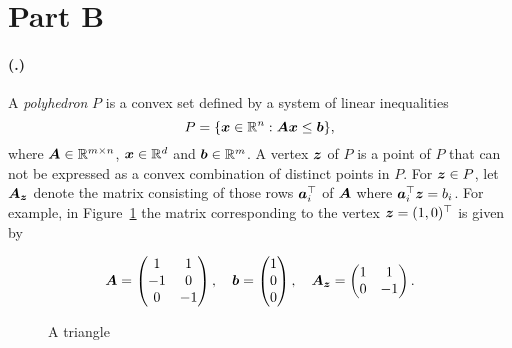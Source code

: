 \documentclass{article}
\newcounter{problemSheetNumber}
\newcounter{problems}
\renewcommand{\problem}{\paragraph{(\theproblemSheetNumber.\theproblems)}\addtocounter{problems}{1}}
\begin{document}
\begin{itemize}
\begin{figure}[h!]
\end{figure}
\end{itemize}

\section*{Part B}
\problem A {\em polyhedron} $P$ is a convex set defined by a system of linear inequalities
\begin{equation*}
 P = \{\bm{x}\in \mathbb{R}^n \mathrel{\mathop{:}} \bm{A}\bm{x}\leq \bm{b}\},
\end{equation*}
where $\bm{A}\in \mathbb{R}^{m\times n}$, $\bm{x}\in \mathbb{R}^d$ and $\bm{b}\in \mathbb{R}^m$. A vertex $\bm{z}$ of $P$ is a point of $P$ that can not
be expressed as a convex combination of distinct points in $P$. 
For $\bm{z}\in P$, let $\bm{A}_{\bm{z}}$ denote the matrix consisting of those rows $\bm{a}_i^{\top}$ of $\bm{A}$ where $\bm{a}_i^{\top}\bm{z}=b_i$. For example, in Figure~\ref{fig:triangle} the matrix corresponding to the vertex $\bm{z}=(1,0)^{\top}$ is given by
\begin{figure}[h!]
\centering
\begin{minipage}{0.3\textwidth}
\centering
{}
\end{minipage}%
\begin{minipage}{0.7\textwidth}
\begin{equation*}
 \bm{A} = \begin{pmatrix}
            1 & 1\\
            -1 & 0\\
            0 & -1\\
           \end{pmatrix}, \quad
 \bm{b} = \begin{pmatrix}
            1 \\ 0 \\ 0
           \end{pmatrix}, \quad
           \bm{A}_{\bm{z}} = \begin{pmatrix}
                      1 & 1\\
                      0 & -1
                     \end{pmatrix}.
\end{equation*}
\end{minipage}
\caption{A triangle}\label{fig:triangle}
\end{figure}
\end{document}
